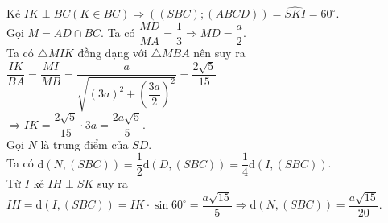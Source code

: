 \begin{ex}
{\begin{center}
		\end{center}
		Kẻ $IK\perp BC(K\in BC)\Rightarrow\left((SBC);(ABCD)\right)=\widehat{SKI}=60^{\circ}$.\\
		Gọi $M=AD\cap BC$. Ta có $\dfrac{MD}{MA}=\dfrac{1}{3}\Rightarrow MD=\dfrac{a}{2}$.\\
		Ta có $\triangle MIK$ đồng dạng với $\triangle MBA$ nên suy ra $\dfrac{IK}{BA}=\dfrac{MI}{MB}=\dfrac{a}{\sqrt{(3a)^2+\left(\dfrac{3a}{2}\right)^2}}=\dfrac{2\sqrt{5}}{15}$ \\
		$ \Rightarrow IK=\dfrac{2\sqrt{5}}{15}\cdot 3a=\dfrac{2a\sqrt{5}}{5} $.\\
		Gọi $N$ là trung điểm của $SD$.\\
		Ta có $\mathrm{d}\left(N,(SBC)\right)=\dfrac{1}{2}\mathrm{d}\left(D,(SBC)\right)=\dfrac{1}{4}\mathrm{d}\left(I,(SBC)\right)$.\\
		Từ $I$ kẻ $IH\perp SK$ suy ra $IH=\mathrm{d}\left(I,(SBC)\right)=IK\cdot\sin 60^{\circ}=\dfrac{a\sqrt{15}}{5}\Rightarrow\mathrm{d}\left(N,(SBC)\right)=\dfrac{a\sqrt{15}}{20}$.}
\end{ex}
